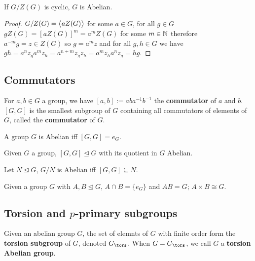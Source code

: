 \documentclass[../Year2.tex]{subfiles}
\begin{document}
\begin{proposition}
    If $G/Z(G)$ is cyclic, $G$ is Abelian.
    \begin{proof}
         $G/Z(G)=\left\langle aZ(G) \right\rangle$ for some $a\in G$, for all $g\in G$ $gZ(G)={[aZ(G)]}^m=a^m Z(G)$ for some $m\in\mathbb{N}$ therefore $a^{-m}g=z\in Z(G)$ so $g=a^m z$ and for all $g,h\in G$ we have $gh=a^n z_g a^m z_h = a^{n+m}z_g z_h = a^m z_h a^n z_g=hg$.
    \end{proof}
\end{proposition}

\subsection{Commutators}

\begin{definition}[Commutator]
    For $a,b\in G$ a group, we have $[a,b]:=aba^{-1}b^{-1}$ the \textbf{commutator} of $a$ and $b$. $[G,G]$ is the smallest subgroup of $G$ containing all commutators of elements of $G$, called the \textbf{commutator} of $G$.
\end{definition}

\begin{remark}
    A group $G$ is Abelian iff $[G,G]=e_G$.
\end{remark}

\begin{theorem}
    Given $G$ a group, $[G,G]\unlhd G$ with its quotient in $G$ Abelian.
\end{theorem}

\begin{theorem}
    Let $N\unlhd G$, $G/N$ is Abelian iff $[G,G]\subseteq N$.
\end{theorem}

\begin{theorem}
    Given a group $G$ with $A,B\unlhd G$, $A\cap B=\{e_G\}$ and $AB=G$; $A\times B\cong G$.
\end{theorem}

\subsection{Torsion and $p$-primary subgroups}

\begin{definition}
    Given an abelian group $G$, the set of elemnts of $G$ with finite order form the \textbf{torsion subgroup} of $G$, denoted $G_{\tors}$. When $G=G_{\tors}$, we call $G$ a \textbf{torsion Abelian group}.
\end{definition}
\end{document}
